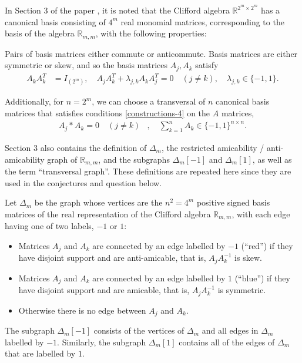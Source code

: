 \documentclass[11pt,a4paper]{jacodesmath}
\newcommand{\mb}[1]{\mathbb{#1}}
\newcommand{\R}{\mb{R}}
\begin{document}
In Section 3 of the paper  \cite{Leo14Constructions},
it is noted that the Clifford algebra $\R^{2^m \times 2^m}$ has a canonical basis consisting of
$4^m$ real monomial matrices,
corresponding to the basis of the algebra $\R_{m,m}$, with the following properties:

Pairs of basis matrices either commute or anticommute.
Basis matrices are either symmetric or skew,
and so the basis matrices $A_j, A_k$ satisfy
%
\begin{align}
%
 A_k A_k^T &= I_{(2^m)},
\quad
 A_j A_k^T + \lambda_{j,k} A_k A_j^T = 0 \quad (j \neq k),
\quad
\lambda_{j,k} \in \{-1,1\}.
%
\label{A-property-1}
\end{align}

Additionally, for $n=2^m$, we can choose a transversal of $n$ canonical basis matrices that
satisfies conditions \eqref{constructions-4} on the $A$ matrices,
%
\begin{align}
%
 A_j \ast A_k = 0 \quad (j \neq k)&,
\quad
\sum_{k=1}^n A_k \in \{-1,1\}^{n \times n}.
%
\label{A-property-2}
\end{align}

Section 3 also contains the definition of $\varDelta_m$, the restricted amicability /
anti-amicability graph of $\R_{m,m}$,
and the subgraphs $\varDelta_m[-1]$ and $\varDelta_m[1]$, as well as the term ``transversal graph''.
These definitions are repeated here since they are used in the conjectures and question below.
\begin{definition}\label{definition-delta}
\cite[p. 225]{Leo14Constructions}

Let $\varDelta_m$ be the graph whose vertices are the $n^2=4^m$
positive signed basis matrices of the real representation
of the Clifford algebra $\R_{m,m}$,
with each edge having one of two labels, $-1$ or $1$:
\begin{itemize}
\item
Matrices $A_j$ and $A_k$ are connected by an edge labelled by $-1$ (``red'') if they have disjoint
support and are anti-amicable,
that is, $A_j A_k^{-1}$ is skew.
\item
Matrices $A_j$ and $A_k$ are connected by an edge labelled by $1$ (``blue'') if they have disjoint
support and are amicable,
that is, $A_j A_k^{-1}$ is symmetric.
\item
Otherwise there is no edge between $A_j$ and $A_k$.
\end{itemize}
The subgraph $\varDelta_m[-1]$ consists of the vertices of $\varDelta_m$ and all edges in
$\varDelta_m$ labelled by $-1$.
Similarly, the subgraph $\varDelta_m[1]$ contains all of the edges of $\varDelta_m$ that are
labelled by $1$.
\end{definition}
\end{document}
